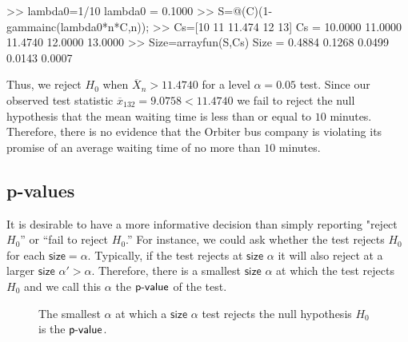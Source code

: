 \begin{example}
\begin{VrbM}
>> lambda0=1/10
lambda0 =    0.1000
>> S=@(C)(1-gammainc(lambda0*n*C,n)); %
>> Cs=[10 11 11.474 12 13] %
Cs =   10.0000   11.0000   11.4740   12.0000   13.0000
>> Size=arrayfun(S,Cs) %
Size =    0.4884    0.1268    0.0499    0.0143    0.0007
\end{VrbM}  
Thus, we reject $H_0$ when $\overline{X}_n>11.4740$ for a level $\alpha=0.05$ test.  Since our observed test statistic $\overline{x}_{132}=9.0758 < 11.4740$ we fail to reject the null hypothesis that the mean waiting time is less than or equal to $10$ minutes.  Therefore, there is no evidence that the Orbiter bus company is violating its promise of an average waiting time of no more than $10$ minutes.
\end{example}



\subsection{p-values}\label{S:p-values}
It is desirable to have a more informative decision than simply reporting "reject $H_0$'' or ``fail to reject $H_0$.''  For instance, we could ask whether the test rejects $H_0$ for each $\mathsf{size}=\alpha$.  Typically, if the test rejects at $\mathsf{size}$ $\alpha$ it will also reject at a larger $\mathsf{size}$ $\alpha' > \alpha$.  Therefore, there is a smallest $\mathsf{size}$ $\alpha$ at which the test rejects $H_0$ and we call this $\alpha$ the $\mbox{\sf{p-value}}$ of the test.

\begin{figure}[h]
\caption{The smallest $\alpha$ at which a $\mathsf{size}$ $\alpha$ test rejects the null hypothesis $H_0$ is the $\mbox{\sf{p-value}}$.}\label{F:pvalue}
\begin{center}
\end{center}
\end{figure}

